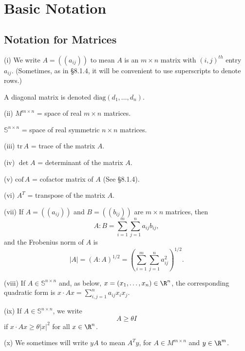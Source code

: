 

\section{Basic Notation}
\label{sec:basic-notation}

\subsection{Notation for Matrices}
\label{sec:notation-for-matrices}

\begin{definition}
\label{def:matrix-notation-basic}
(i) We write $A = ((a_{ij}))$ to mean $A$ is an $m \times n$ matrix with $(i,j)^{th}$ entry $a_{ij}$. (Sometimes, as in \S8.1.4, it will be convenient to use superscripts to denote rows.)

A diagonal matrix is denoted $\text{diag}(d_1, \ldots, d_n)$.

(ii) $M^{m \times n}$ = space of real $m \times n$ matrices.

$\mathbb{S}^{n \times n}$ = space of real symmetric $n \times n$ matrices.

(iii) $\text{tr}\, A$ = trace of the matrix $A$.

(iv) $\det A$ = determinant of the matrix $A$.

(v) $\text{cof}\, A$ = cofactor matrix of $A$ (See \S8.1.4).

(vi) $A^T$ = transpose of the matrix $A$.

(vii) If $A = ((a_{ij}))$ and $B = ((b_{ij}))$ are $m \times n$ matrices, then
$$A : B = \sum_{i=1}^{m} \sum_{j=1}^{n} a_{ij} b_{ij},$$
and the Frobenius norm of $A$ is
$$|A| = (A : A)^{1/2} = \left(\sum_{i=1}^{m} \sum_{j=1}^{n} a_{ij}^2\right)^{1/2}.$$
\end{definition}

\begin{definition}
\label{def:matrix-quadratic-form-notation}
(viii) If $A \in \mathbb{S}^{n \times n}$ and, as below, $x = (x_1, \ldots, x_n) \in \R^n$, the corresponding quadratic form is $x \cdot Ax = \sum_{i,j=1}^{n} a_{ij} x_i x_j$.

(ix) If $A \in \mathbb{S}^{n \times n}$, we write
$$A \geq \theta I$$
if $x \cdot Ax \geq \theta |x|^2$ for all $x \in \R^n$.

(x) We sometimes will write $yA$ to mean $A^T y$, for $A \in M^{m \times n}$ and $y \in \R^m$.
\end{definition}

